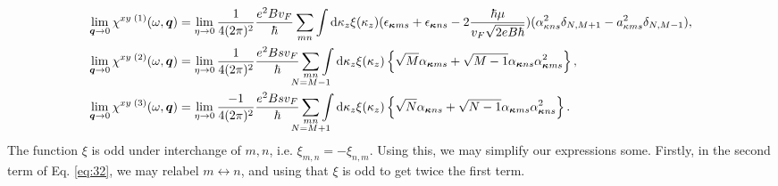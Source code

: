 \begin{align}
  \label{eq:32}
  \lim_{\vec{q}\to 0} \chi ^{xy\; (1)} (\omega , \vec{q}) &=
                                        \lim_{\eta \to 0} \frac{1}{4(2\pi )^2}
                                        \frac{e^2 B v_F}{\hbar }
                                        \sum\limits_{mn}
                                        \int \mathrm{d}\kappa _z
  \xi(\kappa _z)
  (\epsilon _{\vec{\kappa}  m  s} + \epsilon _{\vec{\kappa} ns} - 2 \frac{\hbar \mu }{v_F \sqrt{2eB\hbar }})
 (\alpha _{\kappa n s}^2 \delta _{N, M+1} - a_{\kappa m s}^2 \delta _{N, M-1}) ,\\
  \label{eq:33}
  \lim_{\vec{q}\to 0} \chi ^{xy\; (2)} (\omega , \vec{q}) &=
                                        \lim_{\eta \to 0} \frac{1}{4(2\pi )^2}
                                        \frac{e^2 B s v_F}{\hbar }
                                        \sum\limits_{\substack{mn\\ \mathclap{N= M-1}}}
                                        \int \mathrm{d}\kappa _z
                                        \xi(\kappa_z)
                                        \left\{
                                          \sqrt{M} \alpha _{\vec{\kappa } m s}
                                          +
                                          \sqrt{M-1} \alpha _{\vec{\kappa } n s} \alpha _{\vec{\kappa } ms}^2
                                        \right\},\\
  \label{eq:34}
  \lim_{\vec{q}\to 0} \chi ^{xy\; (3)} (\omega , \vec{q}) &=
                                        \lim_{\eta \to 0} \frac{-1}{4(2\pi )^2}
                                        \frac{e^2 B s v_F}{\hbar }
                                        \sum\limits_{\substack{mn\\ \mathclap{N= M+1}}}
                                        \int \mathrm{d}\kappa _z
                                        \xi(\kappa_z)
                                        \left\{
                                          \sqrt{N} \alpha _{\vec{\kappa } n s}
                                          +
                                          \sqrt{N-1} \alpha _{\vec{\kappa } m s} \alpha _{\vec{\kappa } ns}^2
                                        \right\}.
\end{align}
The function \( \xi \) is odd under interchange of \( m,n \), i.e. \( \xi_{m,n} = -\xi _{n,m} \).
Using this, we may simplify our expressions some.
Firstly, in the second term of Eq. \eqref{eq:32}, we may relabel \( m \leftrightarrow n \), and using that \( \xi  \) is odd to get twice the first term.
